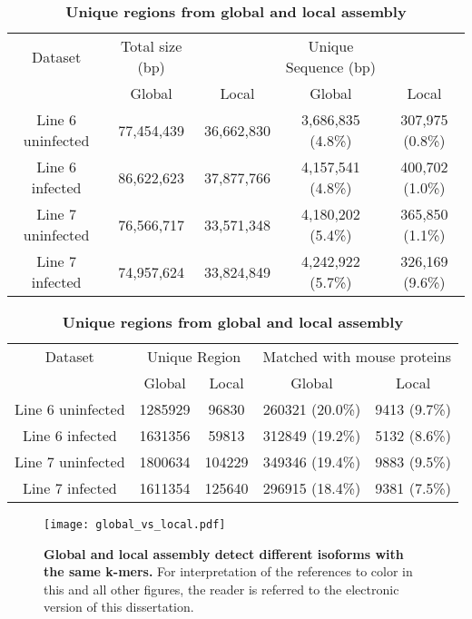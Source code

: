\begin{table}
\caption{
\textbf{Unique sequences between global and local assembly}}
\begin{center}
\begin{tabular}{ccccc}
\hline
Dataset & Total size (bp) & & Unique Sequence (bp) & \\
        & Global & Local & Global & Local\\
\hline
Line 6 uninfected & 77,454,439 & 36,662,830 & 3,686,835 (4.8\%) & 307,975 (0.8\%)\\
Line 6 infected & 86,622,623 & 37,877,766 & 4,157,541 (4.8\%)& 400,702 (1.0\%)\\
Line 7 uninfected & 76,566,717 & 33,571,348 & 4,180,202 (5.4\%) & 365,850 (1.1\%)\\
Line 7 infected & 74,957,624 & 33,824,849 & 4,242,922 (5.7\%)& 326,169 (9.6\%)\\
\hline
\end{tabular}
\end{center}
\label{unique_sequences}

\caption{
\textbf{Unique regions from global and local assembly}}
\begin{center}
\begin{tabular}{ccccc}
\hline
Dataset & \multicolumn{2}{c}{Unique Region} & \multicolumn{2}{c}{Matched with mouse proteins}\\
 & Global & Local & Global & Local\\
\hline
Line 6 uninfected & 1285929 & 96830 & 260321 (20.0\%) & 9413 (9.7\%)\\
Line 6 infected & 1631356 & 59813 & 312849 (19.2\%)& 5132 (8.6\%)\\
Line 7 uninfected & 1800634 & 104229 & 349346 (19.4\%) & 9883 (9.5\%)\\
Line 7 infected & 1611354 & 125640 & 296915 (18.4\%)& 9381 (7.5\%)\\
\hline
\end{tabular}
\label{unique_sequences_matched_mouse}
\end{center}
\end{table}

\begin{figure}[!ht]
\begin{center}
\texttt{[image: global\_vs\_local.pdf]}
\end{center}
\caption{
    \textbf{Global and local assembly detect different isoforms with
    the same k-mers.} For interpretation of the references to color
in this and all other figures, the reader is referred to the
electronic version of this dissertation.
}
\label{img:global_vs_local}
\end{figure}

